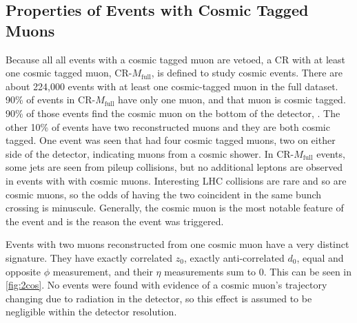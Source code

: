 


\subsection{Properties of Events with Cosmic Tagged Muons}
Because all all events with a cosmic tagged muon are vetoed, a \ac{CR} with at least one cosmic tagged muon, CR-$M_{\textrm{full}}$, is defined to study cosmic events. There are about 224,000 events with at least one cosmic-tagged muon in the full dataset. 90\% of events in CR-$M_{\textrm{full}}$ have only one muon, and that muon is cosmic tagged. 90\% of those events find the cosmic muon on the bottom of the detector, \mb. The other 10\% of events have two reconstructed muons and they are both cosmic tagged. One event was seen that had four cosmic tagged muons, two on either side of the detector, indicating muons from a cosmic shower. In CR-$M_{\textrm{full}}$ events, some jets are seen from pileup collisions, but no additional leptons are observed in events with with cosmic muons. Interesting \ac{LHC} collisions are rare and so are cosmic muons, so the odds of having the two coincident in the same bunch crossing is minuscule. Generally, the cosmic muon is the most notable feature of the event and is the reason the event was triggered.

Events with two muons reconstructed from one cosmic muon have a very distinct signature. They have exactly correlated $z_{0}$, exactly anti-correlated $d_{0}$, equal and opposite $\phi$ measurement, and their $\eta$ measurements sum to 0. This can be seen in \autoref{fig:2cos}. No events were found with evidence of a cosmic muon's trajectory changing due to radiation in the detector, so this effect is assumed to be negligible within the detector resolution.


